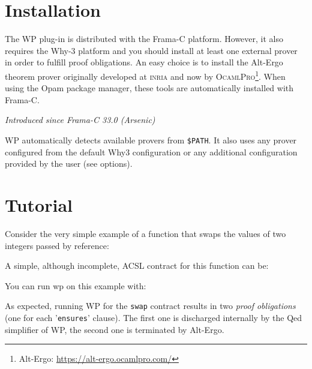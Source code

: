 \clearpage

\section{Installation}
\label{wp-install}

The \textsf{WP} plug-in is distributed with the \textsf{Frama-C}
platform. However, it also requires the \textsf{Why-3} platform and
you should install at least one external prover in
order to fulfill proof obligations. An easy choice is to install the
\textsf{Alt-Ergo} theorem prover originally developed at
\textsc{inria} and now by \textsc{OcamlPro}\footnote{\textsf{Alt-Ergo}:
  \url{https://alt-ergo.ocamlpro.com/}}. When using the \textsf{Opam} package
  manager, these tools are automatically installed with \textsf{Frama-C}.

\emph{Introduced since Frama-C 33.0 (Arsenic)}

\textsf{WP} automatically detects available provers from \verb+$PATH+. It
also uses any prover configured from the default \textsf{Why3} configuration
or any additional configuration provided by the user (see options).

\section{Tutorial}
\label{wp-tutorial}

Consider the very simple example of a function that swaps the values
of two integers passed by reference:


A simple, although incomplete, \textsf{ACSL} contract for this function can be:


You can run \textsf{wp} on this example with:

As expected, running \textsf{WP} for the \texttt{swap} contract
results in two \emph{proof obligations} (one for each '\verb+ensures+'
clause). The first one is discharged internally by the \textsf{Qed}
simplifier of \textsf{WP}, the second one is terminated by
\textsf{Alt-Ergo}.

